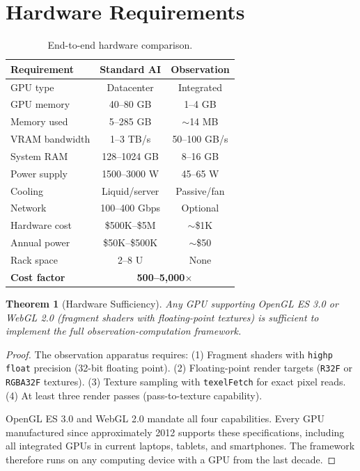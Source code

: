 \documentclass[11pt,twocolumn,a4paper]{article}
\newtheorem{theorem}{Theorem}[section]
\theoremstyle{definition}
\theoremstyle{remark}
\begin{document}
\section{Hardware Requirements}
\label{sec:hardware_requirements}

\begin{table}[H]
\centering
\caption{End-to-end hardware comparison.}
\label{tab:hardware_full}
\begin{tabular}{@{}lcc@{}}
\toprule
\textbf{Requirement} & \textbf{Standard AI} & \textbf{Observation} \\
\midrule
GPU type & Datacenter & Integrated \\
GPU memory & 40--80 GB & 1--4 GB \\
Memory used & 5--285 GB & $\sim$14 MB \\
VRAM bandwidth & 1--3 TB/s & 50--100 GB/s \\
System RAM & 128--1024 GB & 8--16 GB \\
Power supply & 1500--3000 W & 45--65 W \\
Cooling & Liquid/server & Passive/fan \\
Network & 100--400 Gbps & Optional \\
Hardware cost & \$500K--\$5M & $\sim$\$1K \\
Annual power & \$50K--\$500K & $\sim$\$50 \\
Rack space & 2--8 U & None \\
\midrule
\textbf{Cost factor} & \multicolumn{2}{c}{\textbf{500--5{,}000$\times$}} \\
\bottomrule
\end{tabular}
\end{table}

\begin{theorem}[Hardware Sufficiency]
\label{thm:hardware_sufficiency}
Any GPU supporting OpenGL ES 3.0 or WebGL 2.0 (fragment shaders with floating-point textures) is sufficient to implement the full observation-computation framework.
\end{theorem}

\begin{proof}
The observation apparatus requires: (1) Fragment shaders with \texttt{highp float} precision (32-bit floating point). (2) Floating-point render targets (\texttt{R32F} or \texttt{RGBA32F} textures). (3) Texture sampling with \texttt{texelFetch} for exact pixel reads. (4) At least three render passes (pass-to-texture capability).

OpenGL ES 3.0 \citep{glsl_es3_spec} and WebGL 2.0 \citep{webgl2_spec} mandate all four capabilities. Every GPU manufactured since approximately 2012 supports these specifications, including all integrated GPUs in current laptops, tablets, and smartphones. The framework therefore runs on any computing device with a GPU from the last decade.
\end{proof}
\end{document}
